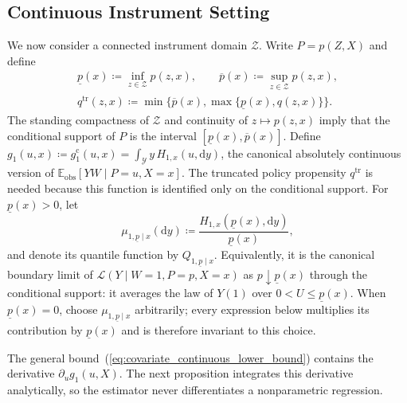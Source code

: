 \subsection{Continuous Instrument Setting}
We now consider a connected instrument domain $\mathcal Z$. Write $P=p(Z,X)$ and define
\begin{gather*}
    \underline{p}(x)\coloneqq\inf_{z\in\mathcal Z}p(z,x),
    \qquad
    \overline{p}(x)\coloneqq\sup_{z\in\mathcal Z}p(z,x), \\
    q^{\mathrm{tr}}(z,x)\coloneqq\min\{\overline{p}(x),\max\{\underline{p}(x),q(z,x)\}\}.
\end{gather*}
The standing compactness of $\mathcal Z$ and continuity of $z\mapsto p(z,x)$ imply that the conditional support of $P$ is the interval $[\underline{p}(x),\overline{p}(x)]$. Define $g_1(u,x)\coloneqq g_1^{\mathrm c}(u,x)=\int_{\mathcal Y}y\,H_{1,x}(u,\mathrm dy)$, the canonical absolutely continuous version of $\mathbb E_{\mathrm{obs}}[YW\mid P=u,X=x]$. The truncated policy propensity $q^{\mathrm{tr}}$ is needed because this function is identified only on the conditional support. For $\underline{p}(x)>0$, let
\begin{equation}\label{eq:boundary_treated_law}
    \mu_{1,\underline p\mid x}(\mathrm dy)
    \coloneqq
    \frac{H_{1,x}(\underline{p}(x),\mathrm dy)}{\underline{p}(x)},
\end{equation}
and denote its quantile function by $Q_{1,\underline p\mid x}$. Equivalently, it is the canonical boundary limit of $\mathcal L(Y\mid W=1,P=p,X=x)$ as $p\downarrow\underline p(x)$ through the conditional support: it averages the law of $Y(1)$ over $0<U\leqslant\underline p(x)$. When $\underline{p}(x)=0$, choose $\mu_{1,\underline p\mid x}$ arbitrarily; every expression below multiplies its contribution by $\underline{p}(x)$ and is therefore invariant to this choice.

The general bound~(\ref{eq:covariate_continuous_lower_bound}) contains the derivative $\partial_u g_1(u,X)$. The next proposition integrates this derivative analytically, so the estimator never differentiates a nonparametric regression.

